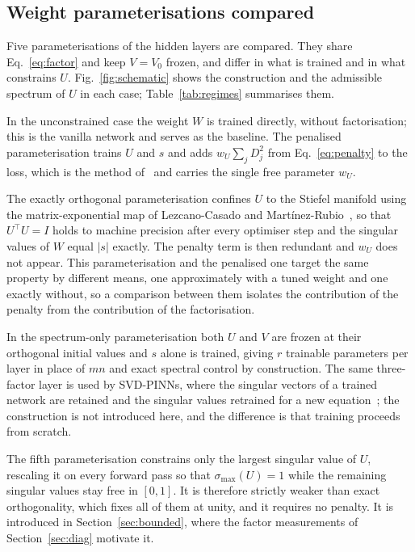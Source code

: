 \documentclass[11pt]{article}
\newcommand{\DU}{D}
\newcommand{\wU}{w_U}
\begin{document}
\subsection{Weight parameterisations compared}

Five parameterisations of the hidden layers are compared. They share
Eq.~\eqref{eq:factor} and keep $V = V_0$ frozen, and differ in what is trained
and in what constrains $U$. Fig.~\ref{fig:schematic} shows the construction and
the admissible spectrum of $U$ in each case; Table~\ref{tab:regimes}
summarises them.

In the unconstrained case the weight $W$ is trained directly, without
factorisation; this is the vanilla network and serves as the baseline. The
penalised parameterisation trains $U$ and $s$ and adds
$\wU \sum_j \DU_j^2$ from Eq.~\eqref{eq:penalty} to the loss, which is the
method of~\cite{wang2026cnpinn} and carries the single free parameter $\wU$.

The exactly orthogonal parameterisation confines $U$ to the Stiefel manifold
using the matrix-exponential map of Lezcano-Casado and
Mart\'inez-Rubio~\cite{lezcano2019orthogonal}, so that $U^\top U = I$ holds to
machine precision after every optimiser step and the singular values of $W$
equal $|s|$ exactly. The penalty term is then redundant and $\wU$ does not
appear. This parameterisation and the penalised one target the same property
by different means, one approximately with a tuned weight and one exactly
without, so a comparison between them isolates the contribution of the penalty
from the contribution of the factorisation.

In the spectrum-only parameterisation both $U$ and $V$ are frozen at their
orthogonal initial values and $s$ alone is trained, giving $r$ trainable
parameters per layer in place of $mn$ and exact spectral control by
construction. The same three-factor layer is used by SVD-PINNs, where the
singular vectors of a trained network are retained and the singular values
retrained for a new equation~\cite{gao2022svdpinn}; the construction is not
introduced here, and the difference is that training proceeds from scratch.

The fifth parameterisation constrains only the largest singular value of $U$,
rescaling it on every forward pass so that $\sigma_{\max}(U) = 1$ while the
remaining singular values stay free in $[0,1]$. It is therefore strictly weaker
than exact orthogonality, which fixes all of them at unity, and it requires no
penalty. It is introduced in Section~\ref{sec:bounded}, where the factor
measurements of Section~\ref{sec:diag} motivate it.
\end{document}
